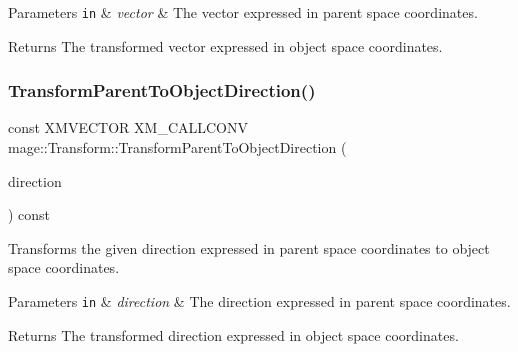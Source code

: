 \begin{DoxyParams}[1]{Parameters}
\mbox{\tt in}  & {\em vector} & The vector expressed in parent space coordinates. \\
\hline
\end{DoxyParams}
\begin{DoxyReturn}{Returns}
The transformed vector expressed in object space coordinates. 
\end{DoxyReturn}
\mbox{\label{classmage_1_1_transform_a0f84d13bf0016a6c98d84ccf0d357b50}} 
\subsubsection{\texorpdfstring{Transform\+Parent\+To\+Object\+Direction()}{TransformParentToObjectDirection()}}
{\footnotesize\ttfamily const X\+M\+V\+E\+C\+T\+OR X\+M\+\_\+\+C\+A\+L\+L\+C\+O\+NV mage\+::\+Transform\+::\+Transform\+Parent\+To\+Object\+Direction (\begin{DoxyParamCaption}\item[{F\+X\+M\+V\+E\+C\+T\+OR}]{direction }\end{DoxyParamCaption}) const\hspace{0.3cm}{\ttfamily [noexcept]}}

Transforms the given direction expressed in parent space coordinates to object space coordinates.


\begin{DoxyParams}[1]{Parameters}
\mbox{\tt in}  & {\em direction} & The direction expressed in parent space coordinates. \\
\hline
\end{DoxyParams}
\begin{DoxyReturn}{Returns}
The transformed direction expressed in object space coordinates. 
\end{DoxyReturn}
\mbox{\label{classmage_1_1_transform_a4b420feb6f839d045a0239056b47772d}} 
